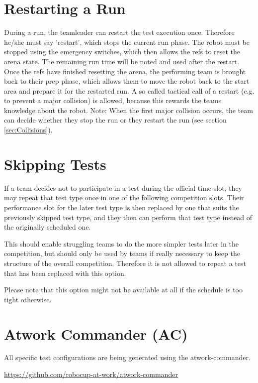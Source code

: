 \section{Restarting a Run}
\label{sec:restartingarun}

During a run, the teamleader can restart the test execution once.
Therefore he/she must say 'restart', which stops the current run phase. The robot must be stopped using the emergency switches, which then allows the refs to reset the arena state.
The remaining run time will be noted and used after the restart. Once the refs have finished resetting the arena, the performing team is brought back to their prep phase, which allows them to move the robot back to the start area and prepare it for the restarted run.
A so called tactical call of a restart (e.g. to prevent a major collision) is allowed, because this rewards the teams knowledge about the robot.
Note: When the first major collision occurs, the team can decide whether they stop the run or they restart the run (see section \ref{sec:Collisions}).


\section{Skipping Tests}

If a team decides not to participate in a test during the official time slot, 
they may repeat that test type once in one of the following competition slots.
Their performance slot for the later test type is then replaced by one that suits the previously skipped test type, and they then can perform that test type instead of the originally scheduled one.

This should enable struggling teams to do the more simpler tests later in the competition,
but should only be used by teams if really necessary to keep the structure of the overall competition. 
Therefore it is not allowed to repeat a test that has been replaced with this option.

Please note that this option might not be available at all if the schedule is too tight otherwise.

\section{Atwork Commander (AC)}
\label{sec:atwork-commander}

All specific test configurations are being generated using the atwork-commander.

\begin{center}
	\url{https://github.com/robocup-at-work/atwork-commander}
\end{center}

